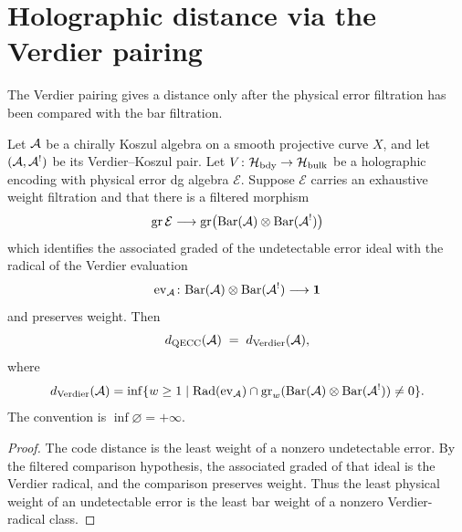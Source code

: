 
\section{Holographic distance via the Verdier pairing}
\label{sec:holographic-verdier-distance}

The Verdier pairing gives a distance only after the physical error
filtration has been compared with the bar filtration.

\begin{theorem}
\label{thm:hc-verdier-distance}
Let $\mathcal{A}$ be a chirally Koszul algebra on a smooth projective curve
$X$, and let $(\mathcal{A},\mathcal{A}^!)$ be its Verdier--Koszul pair. Let
$V\colon \mathcal{H}_{\mathrm{bdy}}\to\mathcal{H}_{\mathrm{bulk}}$ be a holographic
encoding with physical error dg algebra $\mathcal E$. Suppose
$\mathcal E$ carries an exhaustive weight filtration and that there is a
filtered morphism
\[
 \operatorname{gr}\mathcal E
 \longrightarrow
 \operatorname{gr}\bigl(\mathrm{Bar}(\mathcal{A})\otimes\mathrm{Bar}(\mathcal{A}^!)\bigr)
\]
which identifies the associated graded of the undetectable error ideal
with the radical of the Verdier evaluation
\[
 \mathrm{ev}_{\mathcal{A}}\colon
 \mathrm{Bar}(\mathcal{A})\otimes\mathrm{Bar}(\mathcal{A}^!)\longrightarrow \mathbf 1
\]
and preserves weight. Then
\[
 d_{\mathrm{QECC}}(\mathcal{A}) \;=\; d_{\mathrm{Verdier}}(\mathcal{A}),
\]
where
\[
 d_{\mathrm{Verdier}}(\mathcal{A})
 =
 \inf\{w\geq 1\mid
 \operatorname{Rad}(\mathrm{ev}_{\mathcal{A}})\cap
 \operatorname{gr}_w(\mathrm{Bar}(\mathcal{A})\otimes\mathrm{Bar}(\mathcal{A}^!))\neq 0\}.
\]
The convention is $\inf\varnothing=+\infty$.
\end{theorem}

\begin{proof}
The code distance is the least weight of a nonzero undetectable error.
By the filtered comparison hypothesis, the associated graded of that
ideal is the Verdier radical, and the comparison preserves weight.
Thus the least physical weight of an undetectable error is the least bar
weight of a nonzero Verdier-radical class.
\end{proof}

